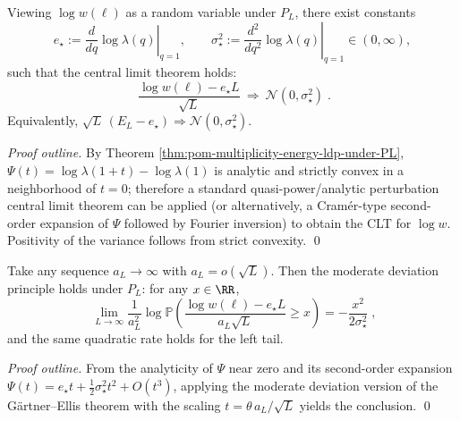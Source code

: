 \begin{theorem}\label{thm:pom-multiplicity-logw-clt}
Viewing \(\log w(\boldsymbol{\ell})\) as a random variable under \(P_L\), there exist constants
\[
e_\star:=\left.\frac{d}{dq}\log\lambda(q)\right|_{q=1},
\qquad
\sigma_\star^2:=\left.\frac{d^2}{dq^2}\log\lambda(q)\right|_{q=1}\in(0,\infty),
\]
such that the central limit theorem holds:
\[
\boxed{\;
\frac{\log w(\boldsymbol{\ell})-e_\star L}{\sqrt{L}}\ \Longrightarrow\ \mathcal{N}(0,\sigma_\star^2)\; } .
\]
Equivalently,
\(
\sqrt{L}\,(E_L-e_\star)\Longrightarrow \mathcal{N}(0,\sigma_\star^2)
\).
\end{theorem}
\begin{proof}[Proof outline]
By Theorem \ref{thm:pom-multiplicity-energy-ldp-under-PL}, \(\Psi(t)=\log\lambda(1+t)-\log\lambda(1)\) is analytic and strictly convex in a neighborhood of \(t=0\);
therefore a standard quasi-power/analytic perturbation central limit theorem can be applied (or alternatively, a Cram\'er-type second-order expansion of \(\Psi\) followed by Fourier inversion) to obtain the CLT for \(\log w\).
Positivity of the variance follows from strict convexity. \qed
\end{proof}

\begin{proposition}\label{prop:pom-multiplicity-logw-mdp}
Take any sequence \(a_L\to\infty\) with \(a_L=o(\sqrt{L})\).
Then the moderate deviation principle holds under \(P_L\): for any \(x\in\RR\),
\[
\boxed{\;
\lim_{L\to\infty}\frac{1}{a_L^2}\log
\mathbb{P}\!\left(\frac{\log w(\boldsymbol{\ell})-e_\star L}{a_L\sqrt{L}}\ge x\right)
=-\frac{x^2}{2\sigma_\star^2}\; } ,
\]
and the same quadratic rate holds for the left tail.
\end{proposition}
\begin{proof}[Proof outline]
From the analyticity of \(\Psi\) near zero and its second-order expansion \(\Psi(t)=e_\star t+\frac12\sigma_\star^2 t^2+O(t^3)\), applying the moderate deviation version of the G\"artner--Ellis theorem with the scaling \(t=\theta\,a_L/\sqrt{L}\) yields the conclusion. \qed
\end{proof}

